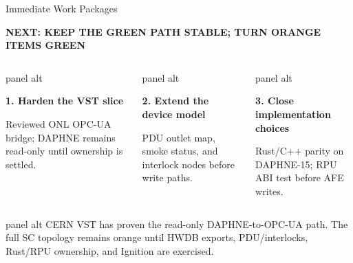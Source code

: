 \documentclass[aspectratio=169,10pt]{beamer}
\newcommand{\eyebrow}[1]{{\color{noircyan}\small\bfseries #1\par}}
\newcommand{\workcard}[3]{%
  \begin{beamercolorbox}[wd=\linewidth,sep=5pt,rounded=true]{panel alt}
  {\small\bfseries\textcolor{#1}{#2}\par}
  \vspace{0.8mm}
  {\footnotesize #3}
  \end{beamercolorbox}%
}
\begin{document}
\begin{frame}[t]{Immediate Work Packages}
\eyebrow{NEXT: KEEP THE GREEN PATH STABLE; TURN ORANGE ITEMS GREEN}
\vspace{2mm}

\begin{columns}[T,onlytextwidth]
\workcard{pocgreen}{1. Harden the VST slice}{
Reviewed ONL OPC-UA bridge; DAPHNE remains read-only until ownership is settled.
}

\workcard{pendingorange}{2. Extend the device model}{
PDU outlet map, smoke status, and interlock nodes before write paths.
}

\workcard{pendingorange}{3. Close implementation choices}{
Rust/C++ parity on DAPHNE-15; RPU ABI test before AFE writes.
}
\end{columns}

\vspace{3mm}
\begin{beamercolorbox}[wd=\linewidth,sep=5pt,rounded=true]{panel alt}
{\scriptsize
CERN VST has proven the read-only DAPHNE-to-OPC-UA path. The full SC topology remains orange until HWDB exports, PDU/interlocks, Rust/RPU ownership, and Ignition are exercised.
}
\end{beamercolorbox}
\end{frame}
\end{document}
